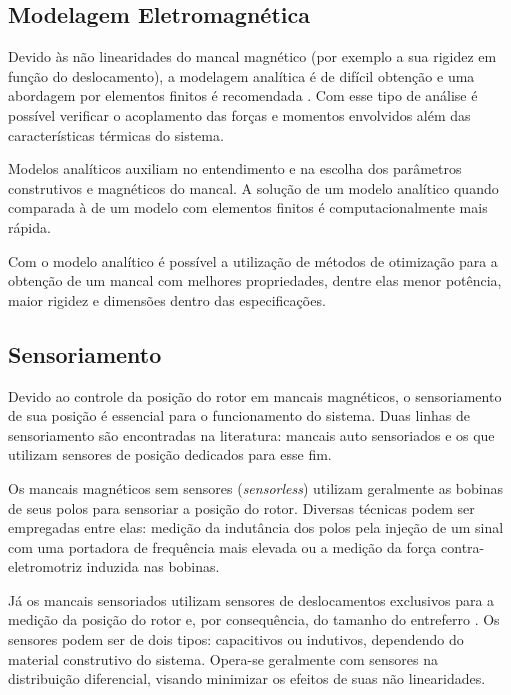 \subsection{Modelagem Eletromagnética}

Devido às não linearidades do mancal magnético (por exemplo a sua rigidez em função do deslocamento), a modelagem analítica é de difícil obtenção e uma abordagem por elementos finitos é recomendada \citep{pilat2007automatic}. Com esse tipo de análise é possível verificar o acoplamento das forças e momentos envolvidos além das características térmicas do sistema.

Modelos analíticos \citep{Tezuka2013, Chiba} auxiliam no entendimento e na escolha dos parâmetros construtivos e magnéticos do mancal. A solução de um modelo analítico quando comparada à de um modelo com elementos finitos é computacionalmente mais rápida.

Com o modelo analítico é possível a utilização de métodos de otimização \citep{Wu2009, Fang2014} para a obtenção de um mancal com melhores propriedades, dentre elas menor potência, maior rigidez e dimensões dentro das especificações. 

\subsection{Sensoriamento}

Devido ao controle da posição do rotor em mancais magnéticos, o sensoriamento de sua posição é essencial para o funcionamento do sistema. Duas linhas de sensoriamento são encontradas na literatura: mancais auto sensoriados \citep{Vischer1993} e os que utilizam sensores de posição dedicados para esse fim.

Os mancais magnéticos sem sensores (\textit{sensorless}) utilizam geralmente as bobinas de seus polos para sensoriar a posição do rotor. Diversas técnicas podem ser empregadas \citep{Hofer2009a, Mukhopadhyay2005} entre elas: medição da indutância dos polos pela injeção de um sinal com uma portadora de frequência mais elevada ou a medição da força contra-eletromotriz induzida nas bobinas.
 
Já os mancais sensoriados utilizam sensores de deslocamentos exclusivos para a medição da posição do rotor e, por consequência, do tamanho do entreferro \citep{Sivadasan1996}. Os sensores podem ser de dois tipos: capacitivos ou indutivos, dependendo do material construtivo do sistema. Opera-se geralmente com sensores na distribuição diferencial, visando minimizar os efeitos de suas não linearidades.
 
